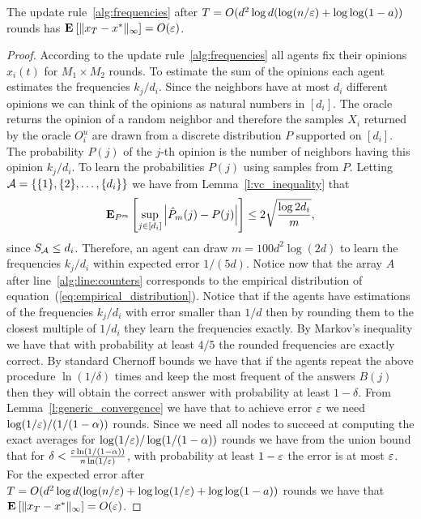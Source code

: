 \begin{theorem}
  The update rule~\ref{alg:frequencies} after
$T = O(d^2 \log d ( \log(n/\varepsilon) + \log \log (1-a))$ rounds
has $\Exp{\norm{\infty}{x_T - x^*}} = O(\eps)$.
\end{theorem}
\begin{proof}
  According to the update rule~\ref{alg:frequencies}
  all agents fix their opinions $x_i(t)$ for $M_1 \times M_2$ rounds.
  To estimate the sum of the opinions each agent estimates the
  frequencies $k_j/d_i$. Since the neighbors have at most $d_i$
  different opinions we can think of the opinions as natural
  numbers in $[d_i]$.  The oracle returns the opinion
  of a random neighbor and therefore the samples $X_i$ returned by
  the oracle $O_i^u$ are drawn from a discrete distribution
  $P$ supported on $[d_i]$.
  The probability $P(j)$ of the $j$-th opinion is the number of neighbors
  having this opinion $k_j/d_i$.
  To learn the probabilities $P(j)$ using samples from $P$.
  Letting $\mathcal{A} = \{\{1\},\{2\},\ldots, \{d_i\}\}$ we have from
  Lemma~\ref{l:vc_inequality} that
  \[
    \bm{\mathrm{E}}_{P^m} \left[ \sup_{j \in [d_i]} \left| \hat{P}_m(j) - P(j) \right| \right]
    \leq 2 \sqrt{\frac{\log{2 d_i}}{m}},
  \]
  since $S_{\mathcal{A}} \leq d_i$. Therefore, an agent can draw
  $m = 100 d^2 \log(2 d)$ to learn the frequencies $k_j/d_i$
  within expected error $1/(5 d)$.
  Notice now that the array $A$ after line~\ref{alg:line:counters}
  corresponds to the empirical distribution of
  equation~(\ref{eq:empirical_distribution}).
  Notice that if the agents have estimations of the frequencies $k_j/d_i$
  with error smaller than $1/d$ then by rounding them to the closest
  multiple of $1/d_i$ they learn the frequencies exactly.
  By Markov's inequality we have that with probability at least $4/5$ the
  rounded frequencies are exactly correct. By standard Chernoff bounds we
  have that if the agents repeat the above procedure
  $\ln(1/\delta)$ times and
  keep the most frequent of the answers $B(j)$ then they will
  obtain the correct answer with probability at least
  $1-\delta$. From Lemma~\ref{l:generic_convergence} we have
  that to achieve error $\varepsilon$ we need $\log(1/\varepsilon)/(1/(1-\alpha))$ rounds.
  Since we need all nodes to succeed at computing the exact averages for
$\log(1/\varepsilon)/\log(1/(1-\alpha))$ rounds we have from the union bound that for
$\delta < \frac{\varepsilon \ln(1/(1-\alpha))}{n \ln(1/\varepsilon)}$, with
probability at least $1-\varepsilon$ the error is at most $\varepsilon$.
For the expected error after
$T = O(d^2 \log d ( \log(n/\varepsilon) + \log \log(1/\varepsilon) + \log \log (1-a))$ rounds
we have that $\Exp{\norm{\infty}{x_T - x^*}} = O(\eps)$.
\end{proof}
